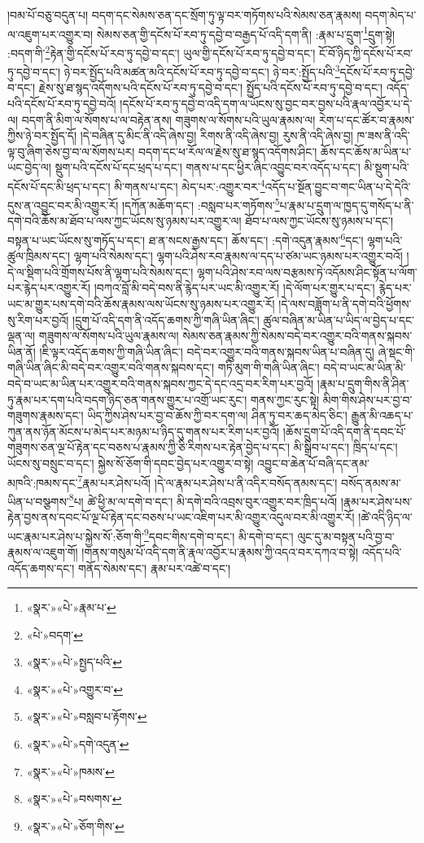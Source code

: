 །བམ་པོ་བཅུ་བདུན་པ། བདག་དང་སེམས་ཅན་དང་སྲོག་ཏུ་ལྟ་བར་གཏོགས་པའི་སེམས་ཅན་རྣམས། བདག་མེད་པ་ལ་འཇུག་པར་འགྱུར་བ། སེམས་ཅན་གྱི་དངོས་པོ་རབ་ཏུ་དབྱེ་བ་བརྒྱད་པོ་འདི་དག་ནི། :རྣམ་པ་དྲུག་\footnote{«སྣར་»«པེ་»རྣམ་པ་}དྲུག་སྟེ། :བདག་གི་\footnote{«པེ་»བདག་}རྟེན་གྱི་དངོས་པོ་རབ་ཏུ་དབྱེ་བ་དང་། ཡུལ་གྱི་དངོས་པོ་རབ་ཏུ་དབྱེ་བ་དང་། ངོ་བོ་ཉིད་ཀྱི་དངོས་པོ་རབ་ཏུ་དབྱེ་བ་དང་། ཉེ་བར་སྤྱོད་པའི་མཚན་མའི་དངོས་པོ་རབ་ཏུ་དབྱེ་བ་དང་། ཉེ་བར་:སྤྱོད་པའི་\footnote{«སྣར་»«པེ་»སྤྱད་པའི་}དངོས་པོ་རབ་ཏུ་དབྱེ་བ་དང་། རྗེས་སུ་ཐ་སྙད་འདོགས་པའི་དངོས་པོ་རབ་ཏུ་དབྱེ་བ་དང་། སྤྱོད་པའི་དངོས་པོ་རབ་ཏུ་དབྱེ་བ་དང་། འདོད་པའི་དངོས་པོ་རབ་ཏུ་དབྱེ་བའོ། །དངོས་པོ་རབ་ཏུ་དབྱེ་བ་འདི་དག་ལ་ཡོངས་སུ་བྱང་བར་བྱས་པའི་རྣལ་འབྱོར་པ་དེ་ལ། བདག་ནི་མིག་ལ་སོགས་པ་ལ་བརྟེན་ནས། གཟུགས་ལ་སོགས་པའི་ཡུལ་རྣམས་ལ། རེག་པ་དང་ཚོར་བ་རྣམས་ཀྱིས་ཉེ་བར་སྤྱོད་དོ། །དེ་བཞིན་དུ་མིང་ནི་འདི་ཞེས་བྱ། རིགས་ནི་འདི་ཞེས་བྱ། རུས་ནི་འདི་ཞེས་བྱ། ཁ་ཟས་ནི་འདི་ལྟ་བུ་ཞིག་ཅེས་བྱ་བ་ལ་སོགས་པར། བདག་དང་ཕ་རོལ་ལ་རྗེས་སུ་ཐ་སྙད་འདོགས་ཤིང་། ཆོས་དང་ཆོས་མ་ཡིན་པ་ཡང་བྱེད་ལ། སྡུག་པའི་དངོས་པོ་དང་ཕྲད་པ་དང་། གནས་པ་དང་ཕྱིར་ཞིང་འབྱུང་བར་འདོད་པ་དང་། མི་སྡུག་པའི་དངོས་པོ་དང་མི་ཕྲད་པ་དང་། མི་གནས་པ་དང་། མེད་པར་:འགྱུར་བར་\footnote{«སྣར་»«པེ་»འགྱུར་བ་}འདོད་པ་སྔོན་བྱུང་བ་གང་ཡིན་པ་དེ་དེའི་དུས་ན་འབྱུང་བར་མི་འགྱུར་རོ། །དཀོན་མཆོག་དང་། :བསླབ་པར་གཏོགས་\footnote{«སྣར་»«པེ་»བསླབ་པ་རྟོགས་}པ་རྣམ་པ་དྲུག་ལ་ཁྱད་དུ་གསོད་པ་ནི་དགེ་བའི་ཆོས་མ་ཐོབ་པ་ལས་ཀྱང་ཡོངས་སུ་ཉམས་པར་འགྱུར་ལ། ཐོབ་པ་ལས་ཀྱང་ཡོངས་སུ་ཉམས་པ་དང་། བསྟན་པ་ཡང་ཡོངས་སུ་གཏོད་པ་དང་། ཐ་ན་སངས་རྒྱས་དང་། ཆོས་དང་། :དགེ་འདུན་རྣམས་\footnote{«སྣར་»«པེ་»དགེ་འདུན་}དང་། ལྷག་པའི་ཚུལ་ཁྲིམས་དང་། ལྷག་པའི་སེམས་དང་། ལྷག་པའི་ཤེས་རབ་རྣམས་ལ་དད་པ་ཙམ་ཡང་ཉམས་པར་འགྱུར་བའོ། །དེ་ལ་སྡིག་པའི་གྲོགས་པོས་ནི་ལྷག་པའི་སེམས་དང་། ལྷག་པའི་ཤེས་རབ་ལས་བརྩམས་ཏེ་འདོམས་ཤིང་སྟོན་པ་ལོག་པར་རྙེད་པར་འགྱུར་རོ། །བཀའ་བློ་མི་བདེ་བས་ནི་རྙེད་པར་ཡང་མི་འགྱུར་རོ། །དེ་ལོག་པར་གྱུར་པ་དང་། རྙེད་པར་ཡང་མ་གྱུར་པས་དགེ་བའི་ཆོས་རྣམས་ལས་ཡོངས་སུ་ཉམས་པར་འགྱུར་རོ། །དེ་ལས་བཟློག་པ་ནི་དགེ་བའི་ཕྱོགས་སུ་རིག་པར་བྱའོ། །དྲུག་པོ་འདི་དག་ནི་འདོད་ཆགས་ཀྱི་གཞི་ཡིན་ཞིང་། ཚུལ་བཞིན་མ་ཡིན་པ་ཡིད་ལ་བྱེད་པ་དང་ལྡན་ལ། གཟུགས་ལ་སོགས་པའི་ཡུལ་རྣམས་ལ། སེམས་ཅན་རྣམས་ཀྱི་སེམས་བདེ་བར་འགྱུར་བའི་གནས་སྐབས་ཡིན་ནོ། །ཇི་ལྟར་འདོད་ཆགས་ཀྱི་གཞི་ཡིན་ཞིང་། བདེ་བར་འགྱུར་བའི་གནས་སྐབས་ཡིན་པ་བཞིན་དུ། ཞེ་སྡང་གི་གཞི་ཡིན་ཞིང་མི་བདེ་བར་འགྱུར་བའི་གནས་སྐབས་དང་། གཏི་མུག་གི་གཞི་ཡིན་ཞིང་། བདེ་བ་ཡང་མ་ཡིན་མི་བདེ་བ་ཡང་མ་ཡིན་པར་འགྱུར་བའི་གནས་སྐབས་ཀྱང་དེ་དང་འདྲ་བར་རིག་པར་བྱའོ། །རྣམ་པ་དྲུག་གིས་ནི་ཤིན་ཏུ་རྣམ་པར་དག་པའི་བདག་ཉིད་ཅན་གནས་གྱུར་པ་འགྲོ་ཡང་རུང་། གནས་ཀྱང་རུང་སྟེ། མིག་གིས་ཤེས་པར་བྱ་བ་གཟུགས་རྣམས་དང་། ཡིད་ཀྱིས་ཤེས་པར་བྱ་བ་ཆོས་ཀྱི་བར་དག་ལ། ཤིན་ཏུ་བར་ཆད་མེད་ཅིང་། རྒྱུན་མི་འཆད་པ་ཀུན་ནས་ཉོན་མོངས་པ་མེད་པར་མཉམ་པ་ཉིད་དུ་གནས་པར་རིག་པར་བྱའོ། །ཆོས་དྲུག་པོ་འདི་དག་ནི་དབང་པོ་གཟུགས་ཅན་ལྔ་པོ་རྟེན་དང་བཅས་པ་རྣམས་ཀྱི་ཅི་རིགས་པར་རྟེན་བྱེད་པ་དང་། མི་སྒྲིབ་པ་དང་། ཁྲིད་པ་དང་། ཡོངས་སུ་བསྲུང་བ་དང་། སྐྱེས་སོ་ཅོག་གི་དབང་བྱེད་པར་འགྱུར་བ་སྟེ། འབྱུང་བ་ཆེན་པོ་བཞི་དང་ནམ་མཁའི་:ཁམས་དང་\footnote{«སྣར་»«པེ་»ཁམས་}རྣམ་པར་ཤེས་པའོ། །དེ་ལ་རྣམ་པར་ཤེས་པ་ནི་འདིར་བསོད་ནམས་དང་། བསོད་ནམས་མ་ཡིན་པ་བསྩགས་\footnote{«སྣར་»«པེ་»བསགས་}པ། ཚེ་ཕྱི་མ་ལ་དགེ་བ་དང་། མི་དགེ་བའི་འབྲས་བུར་འགྱུར་བར་ཁྲིད་པའོ། །རྣམ་པར་ཤེས་པས་རྟེན་བྱས་ནས་དབང་པོ་ལྔ་པོ་རྟེན་དང་བཅས་པ་ཡང་འཇིག་པར་མི་འགྱུར་འདུལ་བར་མི་འགྱུར་རོ། །ཚེ་འདི་ཉིད་ལ་ཡང་རྣམ་པར་ཤེས་པ་སྐྱེས་སོ་:ཅོག་གི་\footnote{«སྣར་»«པེ་»ཅོག་གིས་}དབང་གིས་དགེ་བ་དང་། མི་དགེ་བ་དང་། ལུང་དུ་མ་བསྟན་པའི་བྱ་བ་རྣམས་ལ་འཇུག་གོ། །གནས་གསུམ་པོ་འདི་དག་ནི་རྣལ་འབྱོར་པ་རྣམས་ཀྱི་འདའ་བར་དཀའ་བ་སྟེ། འདོད་པའི་འདོད་ཆགས་དང་། གནོད་སེམས་དང་། རྣམ་པར་འཚེ་བ་དང་། 